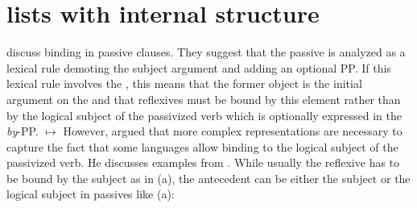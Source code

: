 \documentclass[output=paper
	        ,collection
	        ,collectionchapter
 	        ,biblatex
                ,babelshorthands
                ,newtxmath
                ,draftmode
                ,colorlinks, citecolor=brown
]{langscibook}
\begin{document}



\section{\texorpdfstring{\argst}{ARG-ST} lists with internal structure}
\label{binding-sec-passive}

\citet{MS98a} discuss binding in passive clauses. They suggest that the passive is analyzed as a
lexical rule demoting the subject argument and adding an optional PP. If this lexical rule involves the \argstl, this means
that the former object is the initial argument on the \argstl and that reflexives must be bound by
this element rather than by the logical subject of the passivized verb which is optionally expressed
in the \emph{by}-PP.
\ea
{}
$\mapsto$
\z
However, \citet{Perlmutter1984} argued that more complex representations are necessary to capture the
fact that some languages allow binding to the logical subject of the passivized verb. He discusses
examples from . While usually the reflexive has to be bound by the subject as in
(a), the antecedent can be either the subject or the logical subject in passives like (a):
\end{document}
